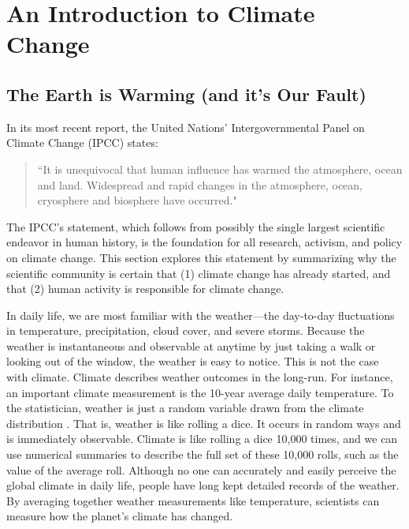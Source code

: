 \newpage
\section{An Introduction to Climate Change}

\subsection{The Earth is Warming (and it's Our Fault)}

In its most recent report, the United Nations' Intergovernmental Panel on Climate Change (IPCC) states:
\begin{quote}
``It is unequivocal that human influence has warmed the atmosphere, ocean and land. Widespread and rapid changes in the atmosphere, ocean, cryosphere and biosphere have occurred." \citep{ipcc1_summary}
\end{quote}
The IPCC's statement, which follows from possibly the single largest scientific endeavor in human history, is the foundation for all research, activism, and policy on climate change. This section explores this statement by summarizing why the scientific community is certain that (1) climate change has already started, and that (2) human activity is responsible for climate change. 

In daily life, we are most familiar with the weather---the day-to-day fluctuations in temperature, precipitation, cloud cover, and severe storms. Because the weather is instantaneous and observable at anytime by just taking a walk or looking out of the window, the weather is easy to notice. This is not the case with climate. Climate describes weather outcomes in the long-run. For instance, an important climate measurement is the 10-year average daily temperature. To the statistician, weather is just a random variable drawn from the climate distribution \citep{auffhammer2018quantifying}. That is, weather is like rolling a dice. It occurs in random ways and is immediately observable. Climate is like rolling a dice 10,000 times, and we can use numerical summaries to describe the full set of these 10,000 rolls, such as the value of the average roll. Although no one can accurately and easily perceive the global climate in daily life, people have long kept detailed records of the weather. By averaging together weather measurements like temperature, scientists can measure how the planet's climate has changed. 

